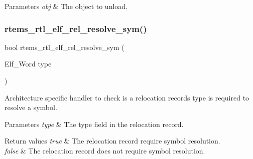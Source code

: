 \begin{DoxyParams}{Parameters}
{\em obj} & The object to unload. \\
\hline
\end{DoxyParams}
\mbox{\label{rtl-elf_8h_a1a9e25c297593836ad3849c98d5727f8}} 
\subsubsection{\texorpdfstring{rtems\_rtl\_elf\_rel\_resolve\_sym()}{rtems\_rtl\_elf\_rel\_resolve\_sym()}}
{\footnotesize\ttfamily bool rtems\+\_\+rtl\+\_\+elf\+\_\+rel\+\_\+resolve\+\_\+sym (\begin{DoxyParamCaption}\item[{Elf\+\_\+\+Word}]{type }\end{DoxyParamCaption})}

Architecture specific handler to check is a relocation record\textquotesingle{}s type is required to resolve a symbol.


\begin{DoxyParams}{Parameters}
{\em type} & The type field in the relocation record. \\
\hline
\end{DoxyParams}

\begin{DoxyRetVals}{Return values}
{\em true} & The relocation record require symbol resolution. \\
\hline
{\em false} & The relocation record does not require symbol resolution. \\
\hline
\end{DoxyRetVals}
\mbox{\label{rtl-elf_8h_ad554c1fb3e8cc0d159424d936b9bfeea}} 
